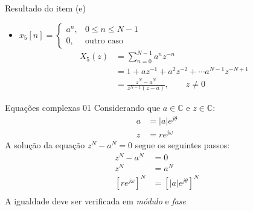 \begin{slide}{Resultado do item (e)}
   \begin{itemize}
      \item $x_5[n]=\begin{cases}a^n, & 0\leq n \leq N-1\\0, & \text{outro caso} \end{cases}$
      \begin{align*}
          X_5(z) &= \sum_{n=0}^{N-1}a^nz^{-n}\\
                 &= 1 + az^{-1} + a^2z^{-2} + \cdots a^{N-1}z^{-N+1}\\
                 &= \frac{z^N-a^N}{z^{N-1} ( z - a )}, \qquad z\neq 0
      \end{align*}
   \end{itemize}
\end{slide}

\begin{note}{Equações complexas 01}
Considerando que $a\in  \mathbb{C}$ e $z \in  \mathbb{C}$: 
      \begin{align*}
         a &= |a|e^{j\theta}\\
         z &= re^{j\omega}
      \end{align*}
A solução da equação $z^N -a^N = 0$ segue os seguintes passos:
      \begin{align*}
          z^N -a^N &= 0\\
               z^N &= a^N\\
      \left [re^{j\omega}\right ]^N &=  \left [|a|e^{j\theta}\right ]^N\\
      \end{align*}
A igualdade deve ser verificada em \emph{módulo} e \emph{fase}
\end{note}

